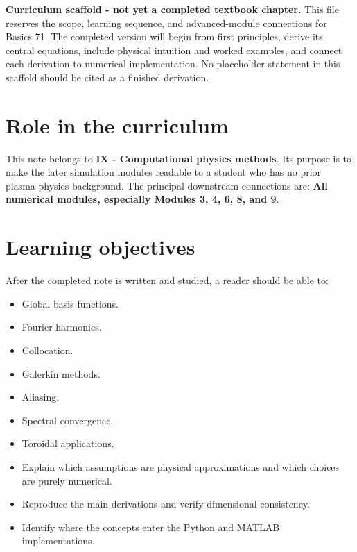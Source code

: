 \documentclass[11pt]{article}
\begin{document}

\begin{overviewbox}
\textbf{Curriculum scaffold - not yet a completed textbook chapter.} This file reserves the scope, learning sequence, and advanced-module connections for Basics 71. The completed version will begin from first principles, derive its central equations, include physical intuition and worked examples, and connect each derivation to numerical implementation. No placeholder statement in this scaffold should be cited as a finished derivation.
\end{overviewbox}

\ProjectTOC

\section{Role in the curriculum}
This note belongs to \textbf{IX - Computational physics methods}. Its purpose is to make the later simulation modules readable to a student who has no prior plasma-physics background. The principal downstream connections are: \textbf{All numerical modules, especially Modules 3, 4, 6, 8, and 9}.

\section{Learning objectives}
After the completed note is written and studied, a reader should be able to:
\begin{itemize}[leftmargin=1.6em]
\item Global basis functions.
\item Fourier harmonics.
\item Collocation.
\item Galerkin methods.
\item Aliasing.
\item Spectral convergence.
\item Toroidal applications.
\item Explain which assumptions are physical approximations and which choices are purely numerical.
\item Reproduce the main derivations and verify dimensional consistency.
\item Identify where the concepts enter the Python and MATLAB implementations.
\end{itemize}
\end{document}
